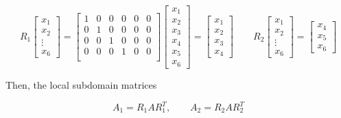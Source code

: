 \begin{equation*}
    R_1
    \begin{bmatrix}
        x_1\\x_2\\\vdots\\x_6
    \end{bmatrix}
=
\begin{bmatrix}
        1 & 0 & 0 & 0 & 0 & 0\\
        0 & 1 & 0 & 0 & 0 & 0\\
        0 & 0 & 1 & 0 & 0 & 0\\
        0 & 0 & 0 & 1 & 0 & 0\\
\end{bmatrix}
    \begin{bmatrix}
        x_1\\x_2\\x_3\\ x_4\\ x_5 \\x_6
    \end{bmatrix}
    =
    \begin{bmatrix}
        x_1\\x_2\\x_3\\ x_4
    \end{bmatrix}
    \qquad
    R_2
    \begin{bmatrix}
        x_1\\x_2\\\vdots\\x_6
    \end{bmatrix}
    =
    \begin{bmatrix}
        x_4\\x_5\\x_6
    \end{bmatrix}
\end{equation*}

Then, the local subdomain matrices

\begin{equation*}
    A_1 = R_1 A R_1^T, \qquad A_2 = R_2AR_2^T
\end{equation*}


